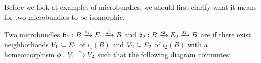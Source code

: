 \begin{myparagraph}
    Before we look at examples of microbundles, we should first clarify
    what it means for two microbundles to be isomorphic.
\end{myparagraph}

\begin{mydefinition}[isomorphy]
    Two microbundles $\bundledef{\bb_1}{B}{E_1}{i_1}{j_1}$ and $\bundledef{\bb_2}{B}{E_2}{i_2}{j_2}$ are  if
    there exist neighborhoods $V_1 \sub E_1$ of $i_1(B)$ and $V_2 \sub E_2$ of $i_2(B)$ with
    a homeomorphism $\phi: V_1 \isomto V_2$ such that the following diagram commutes: 
    \begin{center}
    \end{center}
\end{mydefinition}